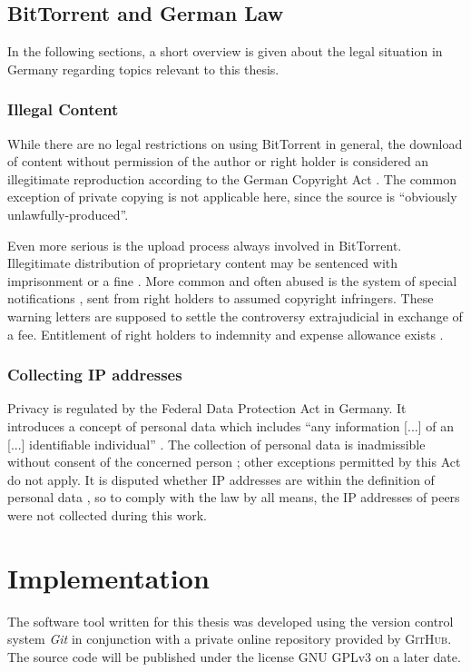 \documentclass[10pt, a4paper, twoside, headsepline]{scrbook}
\renewcommand{\_}{\origunderscore\allowbreak}
\begin{document}
\section{BitTorrent and German Law}
\label{law}
In the following sections, a short overview is given about the legal situation in Germany regarding topics relevant to this thesis.

\subsection{Illegal Content}
While there are no legal restrictions on using BitTorrent in general, the download of content without permission of the author or right holder is considered an illegitimate reproduction according to the German Copyright Act \cite[art.~15\,(1),~16]{urhg}. The common exception of private copying \cite[art.~53]{urhg} is not applicable here, since the source is ``obviously unlawfully-produced''.

Even more serious is the upload process always involved in BitTorrent. Illegitimate distribution of proprietary content may be sentenced with imprisonment or a fine \cite[art.~106]{urhg}. More common and often abused \cite{abmahnung} is the system of special notifications \cite[art.~97a]{urhg}, sent from right holders to assumed copyright infringers. These warning letters are supposed to settle the controversy extrajudicial in exchange of a fee. Entitlement of right holders to indemnity and expense allowance exists \cite[art.~97]{urhg}.

\subsection{Collecting IP addresses}
Privacy is regulated by the Federal Data Protection Act \cite{bdsg} in Germany. It introduces a concept of personal data which includes ``any information [...] of an [...] identifiable individual'' \cite[sec.~3\,(1)]{bdsg}. The collection of personal data is inadmissible without consent of the concerned person \cite[sec.~4]{bdsg}; other exceptions permitted by this Act do not apply. It is disputed whether IP addresses are within the definition of personal data \cite{ip}, so to comply with the law by all means, the IP addresses of peers were not collected during this work.

\chapter{Implementation}
The software tool written for this thesis was developed using the version control system \emph{Git} \cite{git} in conjunction with a private online repository provided by \textsc{GitHub}. The source code will be published \cite{btda} under the license GNU GPLv3 on a later date.
\end{document}
